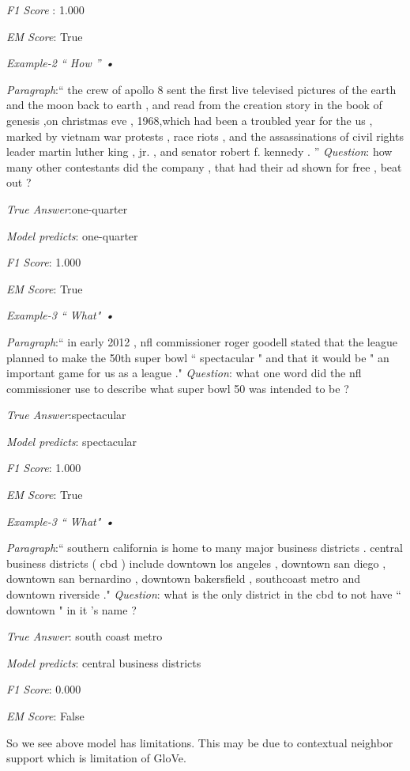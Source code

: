 \documentclass{article} %
\begin{document}
\emph{F1 Score }: 1.000  

\emph{EM Score}: True

\emph{Example-2 ``  How ''  \textbf{•}}

\emph{Paragraph}:``  the crew of apollo 8 sent the first live televised pictures of the earth and the moon back to earth , and read from the creation story in the book of genesis ,on christmas eve , 1968,which had been a troubled year for the us , marked by vietnam war protests , race riots , and the assassinations of civil rights leader martin luther king , jr. , and senator robert f. kennedy . '' 
\emph{Question}: how many other contestants did the company , that had their ad shown for free , beat out ?

\emph{True Answer}:one-quarter 

\textit{Model predicts}: one-quarter

\emph{F1 Score}: 1.000  

\emph{EM Score}: True

\emph{Example-3 ``  What"   \textbf{•}}

\emph{Paragraph}:``  in early 2012 , nfl commissioner roger goodell stated that the league planned to make the 50th super bowl ``  spectacular " and that it would be " an important game for us as a league  ."
\emph{Question}: what one word did the nfl commissioner use to describe what super bowl 50 was intended to be ?

\emph{True Answer}:spectacular

 \textit{Model predicts}: spectacular

\emph{F1 Score}: 1.000 

 \emph{EM Score}: True



\emph{Example-3 `` What"   \textbf{•}}

\emph{Paragraph}:``  southern california is home to many major business districts . central business districts ( cbd ) include downtown los angeles , downtown san diego , downtown san bernardino , downtown bakersfield , southcoast metro and downtown riverside ."  
\emph{Question}: what is the only district in the cbd to not have ``  downtown "   in it 's name ?

\emph{True Answer}: south coast metro

\textit{Model predicts}: central business districts

\emph{F1 Score}: 0.000 

 \emph{EM Score}: False
 
So we see above model has limitations. This may be due to contextual neighbor  support which is limitation of GloVe.
\end{document}
